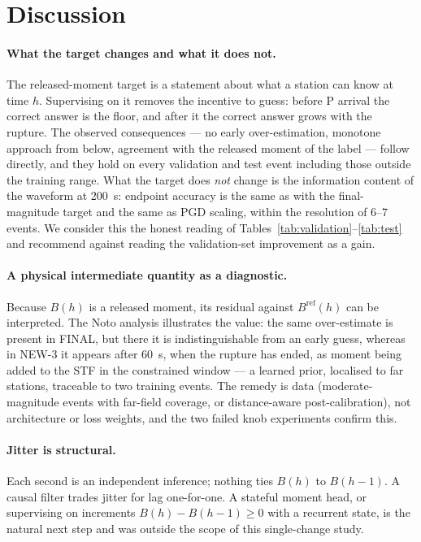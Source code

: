 \documentclass[12pt,letterpaper]{article}
\begin{document}
\section{Discussion}

\paragraph{What the target changes and what it does not.} The released-moment target is a statement about what a station can know at time $h$. Supervising on it removes the incentive to guess: before P arrival the correct answer is the floor, and after it the correct answer grows with the rupture. The observed consequences --- no early over-estimation, monotone approach from below, agreement with the released moment of the label --- follow directly, and they hold on every validation and test event including those outside the training range. What the target does \emph{not} change is the information content of the waveform at 200~s: endpoint accuracy is the same as with the final-magnitude target and the same as PGD scaling, within the resolution of 6--7 events. We consider this the honest reading of Tables~\ref{tab:validation}--\ref{tab:test} and recommend against reading the validation-set improvement as a gain.

\paragraph{A physical intermediate quantity as a diagnostic.} Because $B(h)$ is a released moment, its residual against $B^{\mathrm{ref}}(h)$ can be interpreted. The Noto analysis illustrates the value: the same over-estimate is present in FINAL, but there it is indistinguishable from an early guess, whereas in NEW-3 it appears after 60~s, when the rupture has ended, as moment being added to the STF in the constrained window --- a learned prior, localised to far stations, traceable to two training events. The remedy is data (moderate-magnitude events with far-field coverage, or distance-aware post-calibration), not architecture or loss weights, and the two failed knob experiments confirm this.

\paragraph{Jitter is structural.} Each second is an independent inference; nothing ties $B(h)$ to $B(h-1)$. A causal filter trades jitter for lag one-for-one. A stateful moment head, or supervising on increments $B(h)-B(h-1)\geq0$ with a recurrent state, is the natural next step and was outside the scope of this single-change study.
\end{document}
